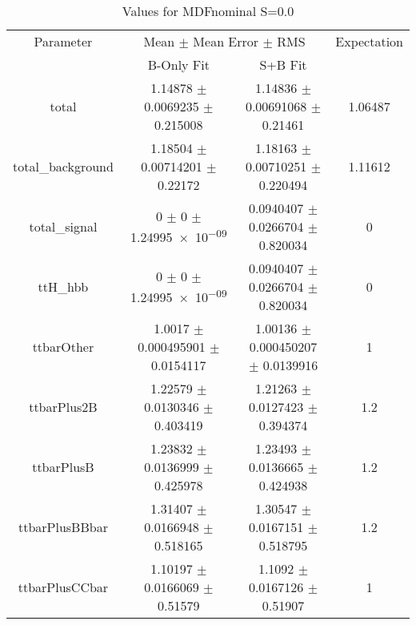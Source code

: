 \begin{table}
\centering
\caption{Values for MDFnominal S=0.0}
\begin{tabular}{cccc}
\toprule
Parameter & \multicolumn{2}{c}{Mean $\pm$ Mean Error $\pm$ RMS} & Expectation\\
 & B-Only Fit & S+B Fit & \\
\midrule
total & \num{1.14878} $\pm$ \num{0.0069235} $\pm$ \num{0.215008} & \num{1.14836} $\pm$ \num{0.00691068} $\pm$ \num{0.21461} & \num{1.06487}\\
total\_background & \num{1.18504} $\pm$ \num{0.00714201} $\pm$ \num{0.22172} & \num{1.18163} $\pm$ \num{0.00710251} $\pm$ \num{0.220494} & \num{1.11612}\\
total\_signal & \num{0} $\pm$ \num{0} $\pm$ \num{1.24995e-09} & \num{0.0940407} $\pm$ \num{0.0266704} $\pm$ \num{0.820034} & \num{0}\\
ttH\_hbb & \num{0} $\pm$ \num{0} $\pm$ \num{1.24995e-09} & \num{0.0940407} $\pm$ \num{0.0266704} $\pm$ \num{0.820034} & \num{0}\\
ttbarOther & \num{1.0017} $\pm$ \num{0.000495901} $\pm$ \num{0.0154117} & \num{1.00136} $\pm$ \num{0.000450207} $\pm$ \num{0.0139916} & \num{1}\\
ttbarPlus2B & \num{1.22579} $\pm$ \num{0.0130346} $\pm$ \num{0.403419} & \num{1.21263} $\pm$ \num{0.0127423} $\pm$ \num{0.394374} & \num{1.2}\\
ttbarPlusB & \num{1.23832} $\pm$ \num{0.0136999} $\pm$ \num{0.425978} & \num{1.23493} $\pm$ \num{0.0136665} $\pm$ \num{0.424938} & \num{1.2}\\
ttbarPlusBBbar & \num{1.31407} $\pm$ \num{0.0166948} $\pm$ \num{0.518165} & \num{1.30547} $\pm$ \num{0.0167151} $\pm$ \num{0.518795} & \num{1.2}\\
ttbarPlusCCbar & \num{1.10197} $\pm$ \num{0.0166069} $\pm$ \num{0.51579} & \num{1.1092} $\pm$ \num{0.0167126} $\pm$ \num{0.51907} & \num{1}\\
\bottomrule
\end{tabular}
\end{table}